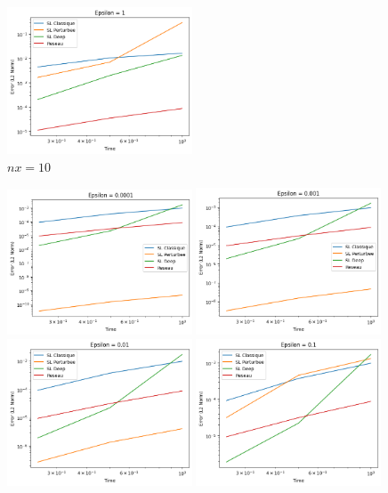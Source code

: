 \documentclass{article}
\begin{document}
\begin{figure}[!h]
    \includegraphics[width=0.49\textwidth]{images/10ep25.png}
    \caption{$nx = 10$}
\end{figure}

\newpage 

\begin{figure}[htbp]
    \centering
    \includegraphics[width=0.49\textwidth]{images/20ep21.png}
    \includegraphics[width=0.49\textwidth]{images/20ep22.png}
    \includegraphics[width=0.49\textwidth]{images/20ep23.png}
    \includegraphics[width=0.49\textwidth]{images/20ep24.png}

\end{figure}
\end{document}
